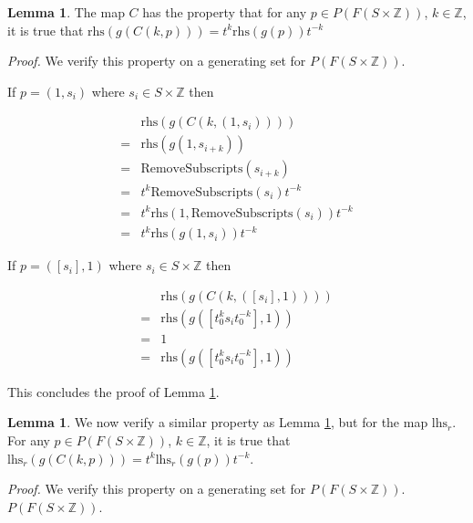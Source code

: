 \documentclass[12pt]{article} %
\theoremstyle{definition}
\theoremstyle{definition}
\theoremstyle{definition}
\newtheorem{lemma}[thm]{Lemma}
\theoremstyle{definition}
\begin{document}
\begin{lemma}\label{conjPlemmarhs}
  The map $C$ has the property that for any $p \in P(F(S \times \mathbb{Z}))$,
  $k \in \mathbb{Z}$, it is true that
  $\text{rhs}(g(C(k, p))) = t^k\text{rhs}(g(p))t^{-k}$
\end{lemma}

\textit{Proof.} We verify this property on a generating set for $P(F(S \times \mathbb{Z}))$.

If $p = (1, s_i)$ where $s_i \in S \times \mathbb{Z}$ then

\begin{equation}
  \begin{aligned}
    & \text{rhs}(g(C(k, (1, s_i)))) \\
    = &\text{rhs}(g(1, s_{i + k})) \\
    = & \text{RemoveSubscripts}(s_{i + k}) \\
    = & t^k \text{RemoveSubscripts}(s_i) t^{-k} \\
    = & t^k \text{rhs} (1, \text{RemoveSubscripts} (s_i)) t^{-k} \\
    = & t^k \text{rhs}(g(1, s_i)) t^{-k}
  \end{aligned}
\end{equation}

If $p = ([s_i], 1)$ where $s_i \in S \times \mathbb{Z}$ then

\begin{equation}
  \begin{aligned}
    & \text{rhs}(g(C(k, ([s_i], 1)))) \\
    = & \text{rhs}(g([t_0^k s_i t_0^{-k}], 1)) \\
    = & 1 \\
    = & \text{rhs}(g([t_0^k s_i t_0^{-k}], 1))
  \end{aligned}
\end{equation}

This concludes the proof of Lemma \ref{conjPlemmarhs}.

\begin{lemma}\label{conjPlemma}
  We now verify a similar property as Lemma \ref{conjPlemmarhs}, but for the map $\text{lhs}_r$.
  For any  $p \in P(F(S \times \mathbb{Z}))$, $k \in \mathbb{Z}$, it is true that
  $\text{lhs}_{r}(g(C(k, p))) = t^k \text{lhs}_{r}(g(p))t^{-k}$.
\end{lemma}

\textit{Proof.} We verify this property on a generating set for $P(F(S \times \mathbb{Z}))$.
$P(F(S \times \mathbb{Z}))$.
\end{document}
